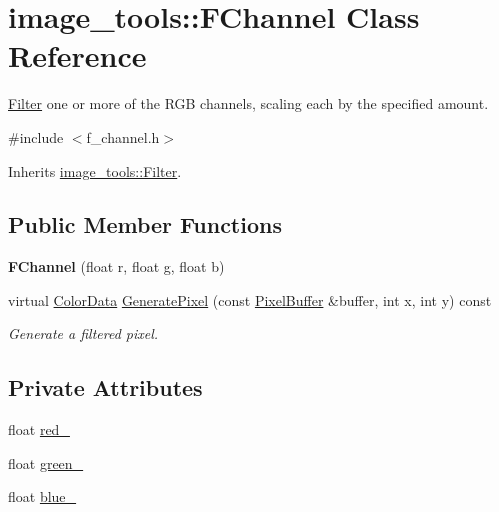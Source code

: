 \hypertarget{classimage__tools_1_1FChannel}{}\section{image\+\_\+tools\+:\+:F\+Channel Class Reference}
\label{classimage__tools_1_1FChannel}


\hyperlink{classimage__tools_1_1Filter}{Filter} one or more of the R\+GB channels, scaling each by the specified amount.  




{\ttfamily \#include $<$f\+\_\+channel.\+h$>$}



Inherits \hyperlink{classimage__tools_1_1Filter}{image\+\_\+tools\+::\+Filter}.

\subsection*{Public Member Functions}
\begin{DoxyCompactItemize}
\item 
{\bfseries F\+Channel} (float r, float g, float b)\hypertarget{classimage__tools_1_1FChannel_a25ea559c6411f4dcdcfad511987688b0}{}\label{classimage__tools_1_1FChannel_a25ea559c6411f4dcdcfad511987688b0}

\item 
virtual \hyperlink{classimage__tools_1_1ColorData}{Color\+Data} \hyperlink{classimage__tools_1_1FChannel_a749ce0d7e3b50b69a73c97917eeb7d0b}{Generate\+Pixel} (const \hyperlink{classimage__tools_1_1PixelBuffer}{Pixel\+Buffer} \&buffer, int x, int y) const 
\begin{DoxyCompactList}\small\item\em Generate a filtered pixel. \end{DoxyCompactList}\end{DoxyCompactItemize}
\subsection*{Private Attributes}
\begin{DoxyCompactItemize}
\item 
float \hyperlink{classimage__tools_1_1FChannel_a6d2b5a5e5bffb3673df6191cf642f337}{red\+\_\+}
\item 
float \hyperlink{classimage__tools_1_1FChannel_a42ef11eef9bfad14df5007959047ccc6}{green\+\_\+}
\item 
float \hyperlink{classimage__tools_1_1FChannel_a3eb08bcf47005e1672b4516b0c75d7a9}{blue\+\_\+}
\end{DoxyCompactItemize}


